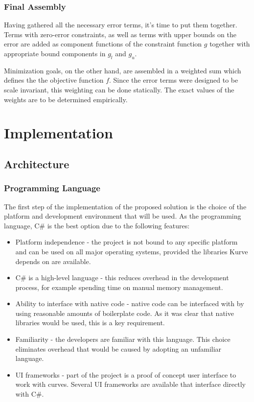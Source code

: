 \documentclass[a4paper]{article}
\begin{document}
			\subsubsection{Final Assembly}
			\label{section:final_assembly}

				Having gathered all the necessary error terms, it's time to put them together. Terms with zero-error constraints, as well as terms with upper bounds on the error are added as component functions of the constraint function \(g\) together with appropriate bound components in \(g_l\) and \(g_u\).

				Minimization goals, on the other hand, are assembled in a weighted sum which defines the the objective function \(f\). Since the error terms were designed to be scale invariant, this weighting can be done statically. The exact values of the weights are to be determined empirically.


	\section{Implementation}

		\subsection{Architecture}
			
			\subsubsection{Programming Language}
			
				The first step of the implementation of the proposed solution is the choice of the platform and development environment that will be used. 
				As the programming language, C\# is the best option due to the following features:
				
				\begin{itemize}
				  	\item Platform independence - the project is not bound to any specific platform and can be used on all major operating systems, provided the libraries Kurve depends on are available. 
				  	\item C\# is a high-level language - this reduces overhead in the development process, for example spending time on manual memory management.
					\item Ability to interface with native code - native code can be interfaced with by using reasonable amounts of boilerplate code. As it was clear that native libraries would be used, this is a key requirement.
					\item Familiarity - the developers are familiar with this language. This choice eliminates overhead that would be caused by adopting an unfamiliar language.
					\item UI frameworks - part of the project is a proof of concept user interface to work with curves. Several UI frameworks are available that interface directly with C\#.
				\end{itemize}
			
\end{document}
